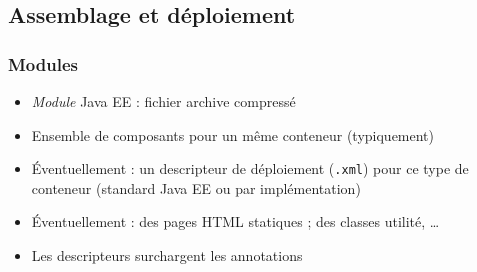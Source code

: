 \documentclass[english, french]{beamer}
\begin{document}
\subsection{Assemblage et déploiement}
\begin{frame}
	\frametitle{Modules}
	\begin{itemize}
		\item \emph{Module} Java EE : fichier archive compressé
		\item Ensemble de composants pour un même conteneur {\tiny (typiquement)}
		\item Éventuellement : un descripteur de déploiement (\texttt{.xml}) pour ce type de conteneur (standard Java EE ou par implémentation)
		\item Éventuellement :  des pages HTML statiques ; des classes utilité, …
		\item Les descripteurs surchargent les annotations
	\end{itemize}
\end{frame}
\end{document}
